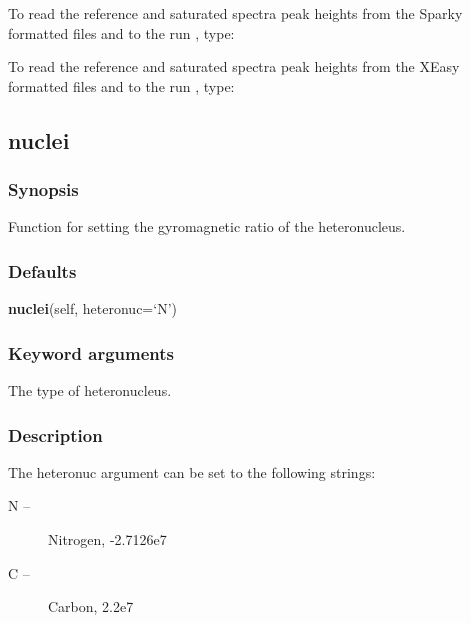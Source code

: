 To read the reference and saturated spectra peak heights from the Sparky formatted files
 and 
 to the run 
, type:




To read the reference and saturated spectra peak heights from the XEasy formatted files
 and 
 to the run 
, type:





\newpage

\subsection{nuclei}


\subsubsection{Synopsis}

Function for setting the gyromagnetic ratio of the heteronucleus.

\subsubsection{Defaults}

\textsf{\textbf{nuclei}(self, heteronuc=`N')}


\subsubsection{Keyword arguments}


  The type of heteronucleus.

\subsubsection{Description}

The heteronuc argument can be set to the following strings:

\begin{description}
\item[    N --]   Nitrogen, -2.7126e7
\item[    C --]   Carbon, 2.2e7
\end{description}


